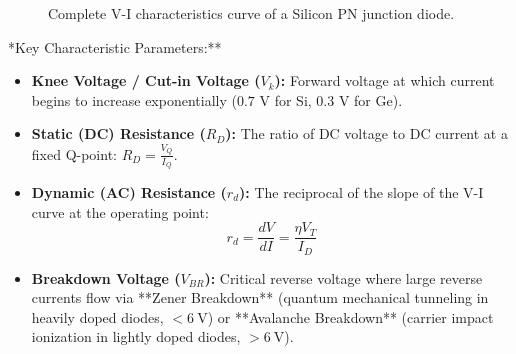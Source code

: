 \begin{figure}[htbp]
\centering
{}
\caption{Complete V-I characteristics curve of a Silicon PN junction diode.}
\label{fig:diode-vi}
\end{figure}

\noindent **Key Characteristic Parameters:**
\begin{itemize}
    \item \textbf{Knee Voltage / Cut-in Voltage ($V_k$):} Forward voltage at which current begins to increase exponentially ($0.7\text{ V}$ for Si, $0.3\text{ V}$ for Ge).
    \item \textbf{Static (DC) Resistance ($R_D$):} The ratio of DC voltage to DC current at a fixed Q-point: $R_D = \frac{V_Q}{I_Q}$.
    \item \textbf{Dynamic (AC) Resistance ($r_d$):} The reciprocal of the slope of the V-I curve at the operating point:
    \begin{equation}
        r_d = \frac{dV}{dI} = \frac{\eta V_T}{I_D}
    \end{equation}
    \item \textbf{Breakdown Voltage ($V_{BR}$):} Critical reverse voltage where large reverse currents flow via **Zener Breakdown** (quantum mechanical tunneling in heavily doped diodes, $< \SI{6}{\volt}$) or **Avalanche Breakdown** (carrier impact ionization in lightly doped diodes, $> \SI{6}{\volt}$).
\end{itemize}

